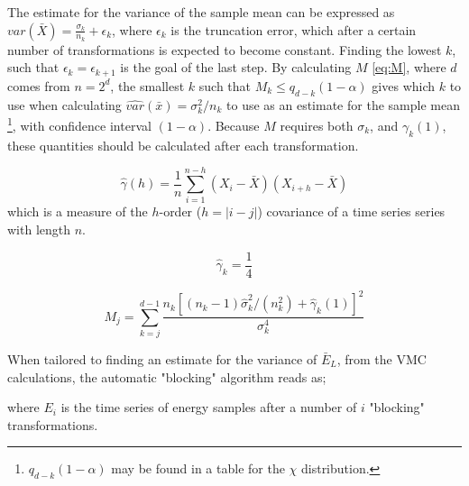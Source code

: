 \documentclass[%
oneside,                 %
final,                   %
10pt]{article}
\begin{document}
The estimate for the variance of the sample mean can be expressed as $var(\bar X) = \frac{\sigma_k}{n_k}+\epsilon_k$, where $\epsilon_k$ is the truncation error, which after a certain number of transformations is expected to become constant. Finding the lowest $k$, such that $\epsilon_k=\epsilon_{k+1}$ is the goal of the last step. By calculating $M$ \eqref{eq:M}, where $d$ comes from $n=2^d$, the smallest $k$ such that $M_k\leq q_{d-k}(1-\alpha)$ gives which $k$ to use when calculating $\hat {var} (\bar x) = \sigma_k^2/n_k$ to use as an estimate for the sample mean \footnote{$q_{d-k}(1-\alpha)$ may be found in a table for the $\chi$ distribution.}, with confidence interval $(1-\alpha)$. Because $M$ requires both $\sigma_k$, and $ \gamma_k(1)$, these quantities should be calculated after each transformation.


\begin{equation}
\hat \gamma(h)=\frac{1}{n} \sum_{i=1}^{n-h} (X_i-\bar X)(X_{i+h}-\bar X) 
\label{eq:samplecovar}
\end{equation}
which is a measure of the $h$-order ($h=|i-j|$) covariance of a time series series with length $n$. 

\begin{equation}
\hat \gamma_k=\frac{1}{4}
\end{equation}


\begin{equation}
M_j=\sum_{k=j}^{d-1} \frac{n_k\left[(n_k-1)\hat \sigma_k^2/(n_k^2)+\hat \gamma_k(1)\right]^2}{\sigma_k^4}
\label{eq:M}
\end{equation}

When tailored to finding an estimate for the variance of $\bar E_L$, from the VMC calculations, the automatic "blocking" algorithm reads as;
\begin{center}\end{center}
where $E_i$ is the time series of energy samples after a number of $i$ "blocking" transformations.
\end{document}
